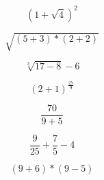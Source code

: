 \documentclass{article}
\begin{document}
\begin{equation}
(1+\sqrt{4})^2
\end{equation}

\begin{equation}
\sqrt{(5+3)*(2+2)}
\end{equation}

\begin{equation}
\sqrt[3]{17-8}-6
\end{equation}

\begin{equation}
(2+1)^{\frac{27}{9}}
\end{equation}

\begin{equation}
\frac{70}{9+5}
\end{equation}

\begin{equation}
\frac{9}{25}+\frac{7}{5}-4
\end{equation}

\begin{equation}
(9+6)*(9-5)
\end{equation}
\end{document}
